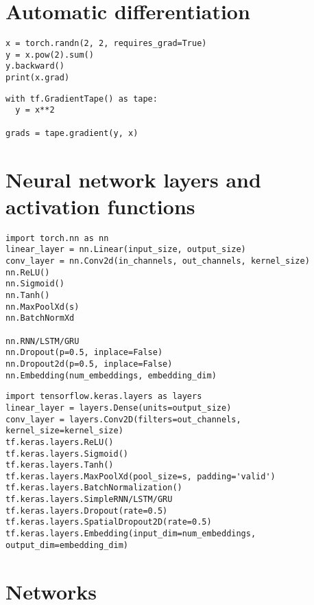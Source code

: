 \documentclass[24pt]{article}
\begin{document}
\section{Automatic differentiation}
 
 
\begin{multicols}{2}
\begin{lstlisting}
x = torch.randn(2, 2, requires_grad=True)
y = x.pow(2).sum()
y.backward()
print(x.grad) 
\end{lstlisting}
\columnbreak

\begin{lstlisting}
with tf.GradientTape() as tape:
  y = x**2

grads = tape.gradient(y, x)
\end{lstlisting}
\end{multicols}
 

 
\section{Neural network layers and activation functions} 


\begin{multicols}{2}
\begin{lstlisting}
import torch.nn as nn
linear_layer = nn.Linear(input_size, output_size)
conv_layer = nn.Conv2d(in_channels, out_channels, kernel_size)
nn.ReLU()
nn.Sigmoid()
nn.Tanh()
nn.MaxPoolXd(s)
nn.BatchNormXd

nn.RNN/LSTM/GRU
nn.Dropout(p=0.5, inplace=False)
nn.Dropout2d(p=0.5, inplace=False)
nn.Embedding(num_embeddings, embedding_dim)
\end{lstlisting}
\columnbreak

\begin{lstlisting}
import tensorflow.keras.layers as layers
linear_layer = layers.Dense(units=output_size)
conv_layer = layers.Conv2D(filters=out_channels, kernel_size=kernel_size)
tf.keras.layers.ReLU()
tf.keras.layers.Sigmoid()
tf.keras.layers.Tanh()
tf.keras.layers.MaxPoolXd(pool_size=s, padding='valid')
tf.keras.layers.BatchNormalization()
tf.keras.layers.SimpleRNN/LSTM/GRU
tf.keras.layers.Dropout(rate=0.5)
tf.keras.layers.SpatialDropout2D(rate=0.5)
tf.keras.layers.Embedding(input_dim=num_embeddings, output_dim=embedding_dim)
\end{lstlisting}
\end{multicols}

\newpage
\section{Networks}
\end{document}
